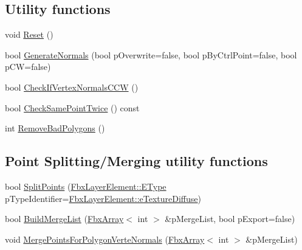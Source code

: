 \subsection*{Utility functions}
\begin{DoxyCompactItemize}
\item 
void \hyperlink{class_fbx_mesh_addb08ad4590a4fcdaf575dbf16c490fd}{Reset} ()
\item 
bool \hyperlink{class_fbx_mesh_abad423b322685ad1c788516e41a3c60f}{Generate\+Normals} (bool p\+Overwrite=false, bool p\+By\+Ctrl\+Point=false, bool p\+CW=false)
\item 
bool \hyperlink{class_fbx_mesh_ae78fd7bf1ee7986774560ed29915189a}{Check\+If\+Vertex\+Normals\+C\+CW} ()
\item 
bool \hyperlink{class_fbx_mesh_a4f49af18c3d12d2436b0547a10ebc262}{Check\+Same\+Point\+Twice} () const
\item 
int \hyperlink{class_fbx_mesh_a90bd43a9b7cc882a78af1e3ed0cf9171}{Remove\+Bad\+Polygons} ()
\end{DoxyCompactItemize}
\subsection*{Point Splitting/\+Merging utility functions}
\begin{DoxyCompactItemize}
\item 
bool \hyperlink{class_fbx_mesh_a3b2104f5d0942fd1e74bc62ec1bc4d52}{Split\+Points} (\hyperlink{class_fbx_layer_element_a8c95c5cd880b56c776acd379bd86f42c}{Fbx\+Layer\+Element\+::\+E\+Type} p\+Type\+Identifier=\hyperlink{class_fbx_layer_element_a8c95c5cd880b56c776acd379bd86f42ca09829e6ecf512e7ae04d9ad8de1342fa}{Fbx\+Layer\+Element\+::e\+Texture\+Diffuse})
\item 
bool \hyperlink{class_fbx_mesh_a4f8376d3f9476bf4c3e7d5db4ac1fa9f}{Build\+Merge\+List} (\hyperlink{class_fbx_array}{Fbx\+Array}$<$ int $>$ \&p\+Merge\+List, bool p\+Export=false)
\item 
void \hyperlink{class_fbx_mesh_a77960edb068c0323698bae275281f920}{Merge\+Points\+For\+Polygon\+Verte\+Normals} (\hyperlink{class_fbx_array}{Fbx\+Array}$<$ int $>$ \&p\+Merge\+List)
\end{DoxyCompactItemize}

